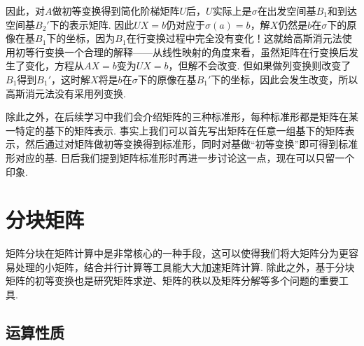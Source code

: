 因此，对$A$做初等变换得到简化阶梯矩阵$U$后，$U$实际上是$\sigma$在出发空间基$B_1$和到达空间基$B_2'$下的表示矩阵. 因此$UX=b$仍对应于$\sigma(a)=b$，解$X$仍然是$b$在$\sigma$下的原像在基$B_1$下的坐标，因为$B_1$在行变换过程中完全没有变化！这就给高斯消元法使用初等行变换一个合理的解释——从线性映射的角度来看，虽然矩阵在行变换后发生了变化，方程从$AX=b$变为$UX=b$，但解不会改变. 但如果做列变换则改变了$B_1$得到$B_1'$，这时解$X$将是$b$在$\sigma$下的原像在基$B_1'$下的坐标，因此会发生改变，所以高斯消元法没有采用列变换.

除此之外，在后续学习中我们会介绍矩阵的三种标准形，每种标准形都是矩阵在某一特定的基下的矩阵表示. 事实上我们可以首先写出矩阵在任意一组基下的矩阵表示，然后通过对矩阵做初等变换得到标准形，同时对基做``初等变换''即可得到标准形对应的基. 日后我们提到矩阵标准形时再进一步讨论这一点，现在可以只留一个印象.

\section{分块矩阵}

矩阵分块在矩阵计算中是非常核心的一种手段，这可以使得我们将大矩阵分为更容易处理的小矩阵，结合并行计算等工具能大大加速矩阵计算. 除此之外，基于分块矩阵的初等变换也是研究矩阵求逆、矩阵的秩以及矩阵分解等多个问题的重要工具.

\subsection{运算性质}

